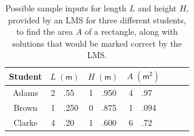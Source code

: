 \documentclass{tufte-handout}
\begin{document}
	\begin{table}[ht]
		\centering
		\selectfont
		\small%
		\begin{tabular}{cr@{}lr@{}lr@{}lcr@{}l}
			\toprule
			Student & \multicolumn{2}{c}{$L\;\mathsf{(m)}$} & \multicolumn{2}{c}{$H\;\mathsf{(m)}$} & \multicolumn{2}{c}{$A\;\mathsf{(m^2)}$}                                                          \\
			\midrule
			Adams   & 2                       & .55                     & 1                       & .950 & 4 & .97  \textcolor{Green4}{\Large\checkmark}  \\
			Brown   & 1                       & .250                    & 0                       & .875 & 1 & .094  \textcolor{Green4}{\Large\checkmark} \\
			Clarke  & 4                       & .20                     & 1                       & .600 & 6 & .72  \textcolor{Green4}{\Large\checkmark}  \\
			\bottomrule
		\end{tabular}
		\caption{Possible sample inputs for length $L$ and height $H$, provided by an LMS for three different students, to find the area $A$ of a rectangle, along with solutions that would be marked correct by the LMS. }
	\end{table}
\end{document}
